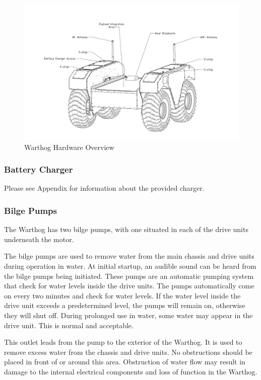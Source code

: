 \documentclass[]{clearpath-latex/clearpath-manual}
\begin{document}
\begin{figure}[h]
  \centering
  \includegraphics[width=1\linewidth]{graphics/Warthog_Drawing_Labeled.png}
  \caption{Warthog Hardware Overview}
  \label{Warthog_overview}
\end{figure}





\pagebreak[4]
\subsubsection{Battery Charger}
Please see Appendix for information about the provided charger.

\subsubsection{Bilge Pumps}\label{bilgepumps}
The Warthog has two bilge pumps, with one situated in each of the drive units underneath the motor.

The bilge pumps are used to remove water from the main chassis and drive units during operation in water. At initial startup, an audible sound can be heard from the bilge pumps being initiated. These pumps are an automatic pumping system that check for water levels inside the drive units. The pumps automatically come on every two minutes and check for water levels. If the water level inside the drive unit exceeds a predetermined level, the pumps will remain on, otherwise they will shut off. During prolonged use in water, some water may appear in the drive unit. This is normal and acceptable.


This outlet leads from the pump to the exterior of the Warthog. It is used to remove excess water from the chassis and drive units. No obstructions should be placed in front of or around this area. Obstruction of water flow may result in damage to the internal electrical components and loss of function in the Warthog.
\end{document}
